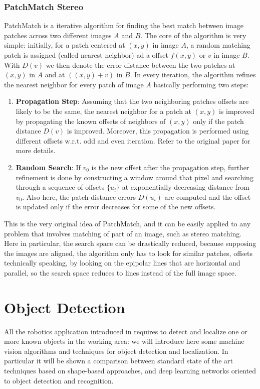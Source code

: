 \subsubsection{PatchMatch Stereo}\label{subsubsec:patchmatchstereo}
PatchMatch \cite{Barnes2011PatchMatch} is a iterative algorithm for finding the best match between image patches across two different images $A$ and $B$. The core of the algorithm is very simple: initially, for a patch centered at $(x, y)$ in image $A$, a random matching patch is assigned (called nearest neighbor) ad a offset $f(x, y)$ or $v$ in image $B$. With $D(v)$ we then denote the error distance between the two patches at $(x, y)$ in $A$ and at $((x, y) + v)$ in $B$. In every iteration, the algorithm refines the nearest neighbor for every patch of image $A$ basically performing two steps:

\begin{enumerate}
	\item \textbf{Propagation Step}: Assuming that the two neighboring patches offsets are likely to be the same, the nearest neighbor for a patch at  $(x, y)$ is improved by propagating the known offsets of neighbors of $(x, y)$ only if the patch distance $D(v)$ is improved. Moreover, this propagation is performed using different offsets w.r.t. odd and even iteration. Refer to the original paper for more details.
	\item \textbf{Random Search}: If $v_0$ is the new offset after the propagation step, further refinement is done by constructing a window around that pixel and searching through a sequence of offsets $\{u_i\}$ at exponentially decreasing distance from $v_0$. Also here, the patch distance errors $D(u_i)$ are computed and the offset is updated only if the error decreases for some of the new offsets.
\end{enumerate}

This is the very original idea of PatchMatch, and it can be easily applied to any problem that involves matching of part of an image, such as stereo matching. Here in particular, the search space can be drastically reduced, because supposing the images are aligned, the algorithm only has to look for similar patches, offsets technically speaking, by looking on the epipolar lines that are horizontal and parallel, so the search space reduces to lines instead of the full image space.

\section{Object Detection}\label{sec:objectdetection}
All the robotics application introduced in  requires to detect and localize one or more known objects in the working area: we will introduce here some machine vision algorithms and techniques for object detection and localization. In particular it will be shown a comparison between standard state of the art techniques based on shape-based approaches, and deep learning networks oriented to object detection and recognition.

